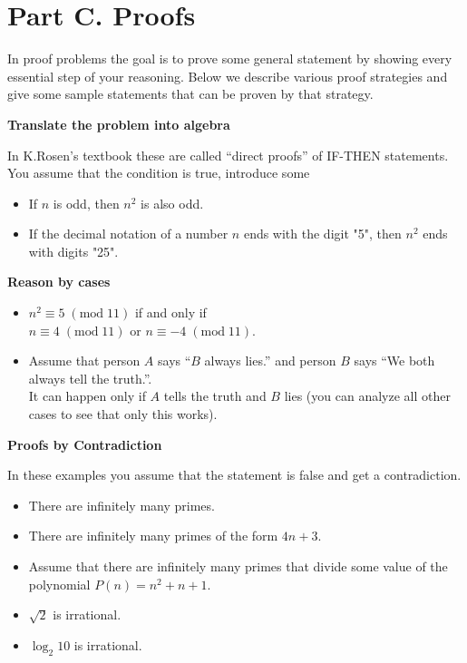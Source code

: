 \documentclass[jou]{apa6}
\begin{document}






\section{Part C. Proofs}

In proof problems the goal is to prove some general statement by 
showing every essential step of your reasoning.
Below we describe various proof strategies and give some sample
statements that can be proven by that strategy.

{\bf Translate the problem into algebra}

In K.Rosen's textbook these are called ``direct proofs''
of IF-THEN statements. 
You assume that the condition is true, introduce some 

\begin{itemize}
\item If $n$ is odd, then $n^2$ is also odd. 
\item If the decimal notation of a number $n$ ends with the digit "5", 
then $n^2$ ends with digits "25". 
\end{itemize}

{\bf Reason by cases}

\begin{itemize}
\item $n^2 \equiv 5\;(\text{mod}\;11)$
if and only if\\
$n \equiv 4\;(\text{mod}\;11)$ 
or $n \equiv -4\;(\text{mod}\;11)$.
\item Assume that person $A$ says ``$B$ always lies.'' and 
person $B$ says ``We both always tell the truth.''.\\
It can happen only if $A$ tells the truth and $B$ lies
(you can analyze all other cases to see that only this works).
\end{itemize}


{\bf Proofs by Contradiction}

In these examples you assume that the statement is false
and get a contradiction.

\begin{itemize}
\item There are infinitely many primes.
\item There are infinitely many primes of the form $4n+3$. 
\item Assume that there are infinitely many primes
that divide some value of the polynomial 
$P(n) = n^2 + n + 1$. 
\item $\sqrt{2}$ is irrational.
\item $\log_2 10$ is irrational.
\end{itemize}
\end{document}
